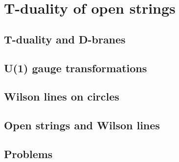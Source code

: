 \documentclass[12pt]{report}
\begin{document}
\chapter{T-duality of open strings}
\newpage
\section{T-duality and D-branes}
\section{U(1) gauge transformations}
\section{Wilson lines on circles}
\section{Open strings and Wilson lines}
\section{Problems}
\end{document}
